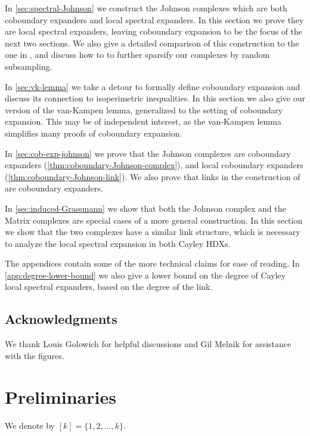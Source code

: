 \documentclass[10pt,a4paper]{article}
\newcommand{\prettyref}[1]{\cref{#1}}
\theoremstyle{definition}
\theoremstyle{remark}
\newcommand{\set}[1]{\{#1\}}
\numberwithin{equation}{section}
\let\pref=\prettyref
\begin{document}
In \pref{sec:spectral-Johnson} we construct the Johnson complexes which are both coboundary expanders and local spectral expanders. In this section we prove they are local spectral expanders, leaving coboundary expansion to be the focus of the next two sections. We also give a detailed comparison of this construction to the one in \cite{LiuMSY2023}, and discuss how to to further sparsify our complexes by random subsampling.

In \pref{sec:vk-lemma} we take a detour to formally define coboundary expansion and discuss its connection to isoperimetric inequalities. In this section we also give our version of the van-Kampen lemma, generalized to the setting of coboundary expansion. This may be of independent interest, as the van-Kampen lemma simplifies many proofs of coboundary expansion.

In \pref{sec:cob-exp-johnson} we prove that the Johnson complexes are coboundary expanders (\pref{thm:coboundary-Johnson-complex}), and local coboundary expanders (\pref{thm:coboundary-Johnson-link}). We also prove that links in the construction of \cite{Golowich2023} are coboundary expanders.

In \pref{sec:induced-Grassmann} we show that both the Johnson complex and the Matrix complexes are special cases of a more general construction. In this section we show that the two complexes have a similar link structure, which is necessary to analyze the local spectral expansion in both Cayley HDXs.

The appendices contain some of the more technical claims for ease of reading. In \pref{app:degree-lower-bound} we also give a lower bound on the degree of Cayley local spectral expanders, based on the degree of the link.

\subsection{Acknowledgments}
We thank Louis Golowich for helpful discussions and Gil Melnik for assistance with the figures.

\section{Preliminaries} \label{sec:prelims}
We denote by \([k]=\set{1,2,\dots,k}\). 
\end{document}
